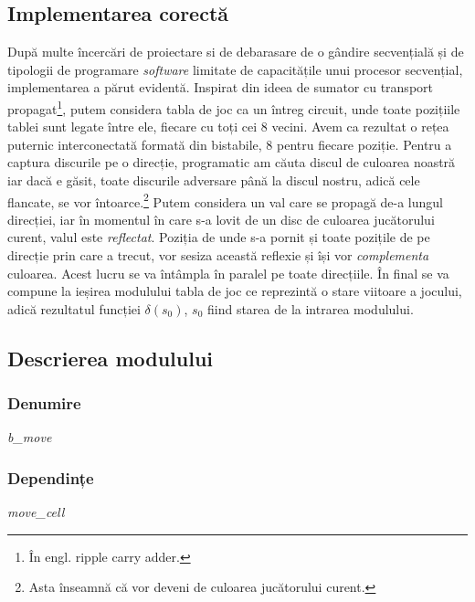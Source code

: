 \documentclass[12pt,twoside,a4paper,fleqn]{book}
\theoremstyle{definition}
\begin{document}
\subsection{Implementarea corectă}
După multe încercări de proiectare si de debarasare de o gândire secvențială și de tipologii de programare \emph{software} limitate de capacitățile unui procesor secvențial, implementarea a părut evidentă. Inspirat din ideea de sumator cu transport propagat\footnote{În engl. ripple carry adder.}, putem considera tabla de joc ca un întreg circuit, unde toate pozițiile tablei sunt legate între ele, fiecare cu toți cei $8$ vecini. Avem ca rezultat o rețea puternic interconectată formată din bistabile, $8$ pentru fiecare poziție. Pentru a captura discurile pe o direcție, programatic am căuta discul de culoarea noastră iar dacă e găsit, toate discurile adversare până la discul nostru, adică cele flancate, se vor întoarce.\footnote{Asta înseamnă că vor deveni de culoarea jucătorului curent.} Putem considera un val care se propagă de-a lungul direcției, iar în momentul în care s-a lovit de un disc de culoarea jucătorului curent, valul este \emph{reflectat}. Poziția de unde s-a pornit și toate pozițile de pe direcție prin care a trecut, vor sesiza această reflexie și își vor \emph{complementa} culoarea. Acest lucru se va întâmpla în paralel pe toate direcțiile. În final se va compune la ieșirea modulului tabla de joc ce reprezintă o stare viitoare a jocului, adică rezultatul funcției $\delta(s_{0})$, $s_{0}$ fiind starea de la intrarea modulului.


\subsection{Descrierea modulului}
\subsubsection{Denumire}
\emph{b\_move}
\subsubsection{Dependințe}
\emph{move\_cell}
\end{document}
